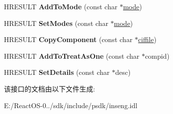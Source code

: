 \begin{DoxyCompactItemize}
H\+R\+E\+S\+U\+LT {\bfseries Add\+To\+Mode} (const char $\ast$\hyperlink{interfacevoid}{mode})
\item 
\mbox{\label{interface_i_cif_r_w_component_ac81d5f09584e00dffd43e08f117ae6ff}} 
H\+R\+E\+S\+U\+LT {\bfseries Set\+Modes} (const char $\ast$\hyperlink{interfacevoid}{mode})
\item 
\mbox{\label{interface_i_cif_r_w_component_ad6d7f112db0e803f44b74dab24a1fc1c}} 
H\+R\+E\+S\+U\+LT {\bfseries Copy\+Component} (const char $\ast$\hyperlink{structciffile}{ciffile})
\item 
\mbox{\label{interface_i_cif_r_w_component_ab0eeeac60d9ae29b12a376a01fed22a3}} 
H\+R\+E\+S\+U\+LT {\bfseries Add\+To\+Treat\+As\+One} (const char $\ast$compid)
\item 
\mbox{\label{interface_i_cif_r_w_component_aadf8ddac8c19d9f8a2e2319d3ac3de0a}} 
H\+R\+E\+S\+U\+LT {\bfseries Set\+Details} (const char $\ast$desc)
\end{DoxyCompactItemize}


该接口的文档由以下文件生成\+:\begin{DoxyCompactItemize}
\item 
E\+:/\+React\+O\+S-\/0../sdk/include/psdk/inseng.\+idl\end{DoxyCompactItemize}

